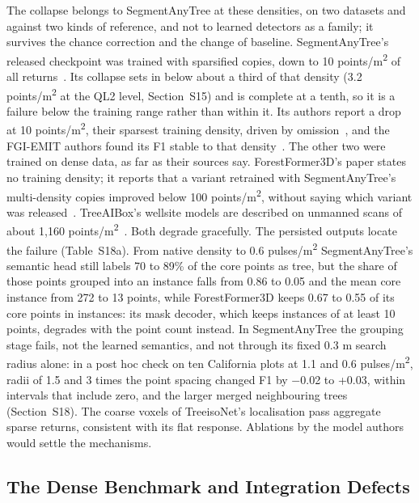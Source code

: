 \documentclass[journal]{IEEEtran}
\begin{document}
The collapse belongs to SegmentAnyTree at these densities, on two datasets and
against two kinds of reference, and not to learned detectors as a family; it
survives the chance correction and the change of baseline. SegmentAnyTree's
released checkpoint was trained with sparsified copies, down to 10 points/m\textsuperscript{2} of
all returns~\cite{wielgosz2024segmentanytree,ruoppa2026benchmarking}. Its collapse
sets in below about a third of that density (3.2 points/m\textsuperscript{2} at the QL2 level,
Section~S15) and is complete at a tenth, so it is a failure below the training
range rather than within it. Its authors report a drop at 10 points/m\textsuperscript{2}, their
sparsest training density, driven by omission~\cite{wielgosz2024segmentanytree}, and
the FGI-EMIT authors found its F1 stable to that density~\cite{ruoppa2026benchmarking}. The other two were trained on dense data, as far as
their sources say. ForestFormer3D's paper states no training density; it reports
that a variant retrained with SegmentAnyTree's multi-density copies improved
below 100 points/m\textsuperscript{2}, without saying which variant was released~\cite{xiang2025forestformer3d}. TreeAIBox's wellsite models are described on
unmanned scans of about 1,160 points/m\textsuperscript{2}~\cite{movchan2025uavbased}. Both degrade
gracefully. The persisted outputs locate the failure (Table~S18a). From native
density to 0.6 pulses/m\textsuperscript{2} SegmentAnyTree's semantic head still labels 70 to 89\%
of the core points as tree, but the share of those points grouped into an
instance falls from 0.86 to 0.05 and the mean core instance from 272 to 13
points, while ForestFormer3D keeps 0.67 to 0.55 of its core points in instances:
its mask decoder, which keeps instances of at least 10 points, degrades with the
point count instead. In SegmentAnyTree the grouping stage fails, not the learned
semantics, and not through its fixed 0.3 m search radius alone: in a post hoc
check on ten California plots at 1.1 and 0.6 pulses/m\textsuperscript{2}, radii of 1.5 and 3 times
the point spacing changed F1 by $-$0.02 to +0.03, within intervals that include
zero, and the larger merged neighbouring trees (Section~S18). The coarse voxels
of TreeisoNet's localisation pass aggregate sparse returns, consistent with its
flat response. Ablations by the model authors would settle the mechanisms.

\subsection{The Dense Benchmark and Integration Defects}\label{sec:6.3}
\end{document}
